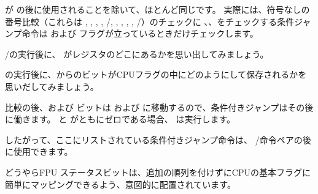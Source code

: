 ﻿




\JA が \SAHF の後に使用されることを除いて、ほとんど同じです。 
実際には、符号なしの番号比較（これらは  , \JAE , \JB , \JBE , \JE/\JZ , \JNA , \JNAE , \JNB , \JNBE , \JNE/\JNZ ）のチェックに
、、をチェックする条件ジャンプ命令は \CF および \ZF フラグが立っているときだけチェックします。

/\FNSTSW の実行後に、 \CThreeBits がレジスタのどこにあるかを思い出してみましょう。



\SAHF の実行後に、からのビットがCPUフラグの中にどのようにして保存されるかを思いだしてみましょう。



比較の後、\Cthree および \Czero ビットは \ZF および \CF に移動するので、条件付きジャンプはその後に働きます。 \CF と \ZF がともにゼロである場合、 \JA は実行します。

したがって、ここにリストされている条件付きジャンプ命令は、 \FNSTSW/\SAHF 命令ペアの後に使用できます。

どうやらFPU \CThreeBits ステータスビットは、追加の順列を付けずにCPUの基本フラグに簡単にマッピングできるよう、意図的に配置されています。
